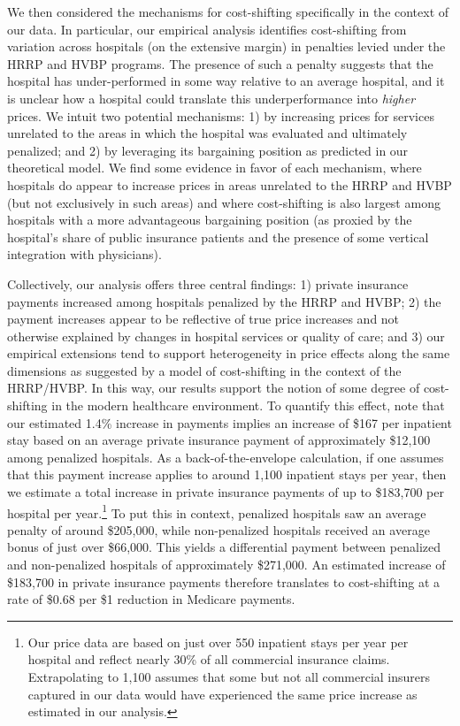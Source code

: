 \documentclass[12pt]{article}
\begin{document}
We then considered the mechanisms for cost-shifting specifically in the context of our data. In particular, our empirical analysis identifies cost-shifting from variation across hospitals (on the extensive margin) in penalties levied under the HRRP and HVBP programs. The presence of such a penalty suggests that the hospital has under-performed in some way relative to an average hospital, and it is unclear how a hospital could translate this underperformance into \textit{higher} prices. We intuit two potential mechanisms: 1) by increasing prices for services unrelated to the areas in which the hospital was evaluated and ultimately penalized; and 2) by leveraging its bargaining position as predicted in our theoretical model. We find some evidence in favor of each mechanism, where hospitals do appear to increase prices in areas unrelated to the HRRP and HVBP (but not exclusively in such areas) and where cost-shifting is also largest among hospitals with a more advantageous bargaining position (as proxied by the hospital's share of public insurance patients and the presence of some vertical integration with physicians).

Collectively, our analysis offers three central findings: 1) private insurance payments increased among hospitals penalized by the HRRP and HVBP; 2) the payment increases appear to be reflective of true price increases and not otherwise explained by changes in hospital services or quality of care; and 3) our empirical extensions tend to support heterogeneity in price effects along the same dimensions as suggested by a model of cost-shifting in the context of the HRRP/HVBP. In this way, our results support the notion of some degree of cost-shifting in the modern healthcare environment. To quantify this effect, note that our estimated 1.4\% increase in payments implies an increase of \$167 per inpatient stay based on an average private insurance payment of approximately \$12,100 among penalized hospitals. As a back-of-the-envelope calculation, if one assumes that this payment increase applies to around 1,100 inpatient stays per year, then we estimate a total increase in private insurance payments of up to \$183,700 per hospital per year.\footnote{Our price data are based on just over 550 inpatient stays per year per hospital and reflect nearly 30\% of all commercial insurance claims. Extrapolating to 1,100 assumes that some but not all commercial insurers captured in our data would have experienced the same price increase as estimated in our analysis.} To put this in context, penalized hospitals saw an average penalty of around \$205,000, while non-penalized hospitals received an average bonus of just over \$66,000. This yields a differential payment between penalized and non-penalized hospitals of approximately \$271,000. An estimated increase of \$183,700 in private insurance payments therefore translates to cost-shifting at a rate of \$0.68 per \$1 reduction in Medicare payments.
\end{document}
